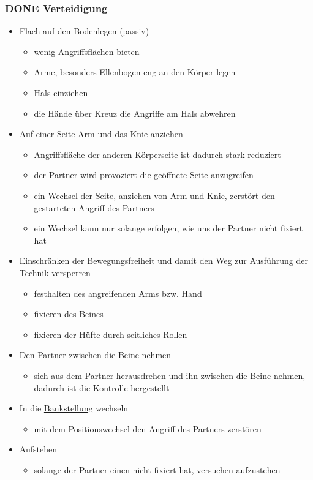 \documentclass[11pt]{article}
\begin{document}
\subsubsection{{\bfseries\sffamily DONE} Verteidigung}
\label{sec:org704bf82}
\begin{itemize}
\item Flach auf den Bodenlegen (passiv)
\begin{itemize}
\item wenig Angriffsflächen bieten
\item Arme, besonders Ellenbogen eng an den Körper legen
\item Hals einziehen
\item die Hände über Kreuz die Angriffe am Hals abwehren
\end{itemize}
\item Auf einer Seite Arm und das Knie anziehen
\begin{itemize}
\item Angriffsfläche der anderen Körperseite ist dadurch stark reduziert
\item der Partner wird provoziert die geöffnete Seite anzugreifen
\item ein Wechsel der Seite, anziehen von Arm und Knie, zerstört den gestarteten Angriff des Partners
\item ein Wechsel kann nur solange erfolgen, wie uns der Partner nicht fixiert hat
\end{itemize}
\item Einschränken der Bewegungsfreiheit und damit den Weg zur Ausführung der Technik versperren
\begin{itemize}
\item festhalten des angreifenden Arms bzw. Hand
\item fixieren des Beines
\item fixieren der Hüfte durch seitliches Rollen
\end{itemize}
\item Den Partner zwischen die Beine nehmen
\begin{itemize}
\item sich aus dem Partner herausdrehen und ihn zwischen die Beine nehmen, dadurch ist die Kontrolle hergestellt
\end{itemize}
\item In die \hyperref[orgbc37293]{Bankstellung} wechseln
\begin{itemize}
\item mit dem Positionswechsel den Angriff des Partners zerstören
\end{itemize}
\item Aufstehen 
\begin{itemize}
\item solange der Partner einen nicht fixiert hat, versuchen aufzustehen
\end{itemize}
\end{itemize}
\end{document}
